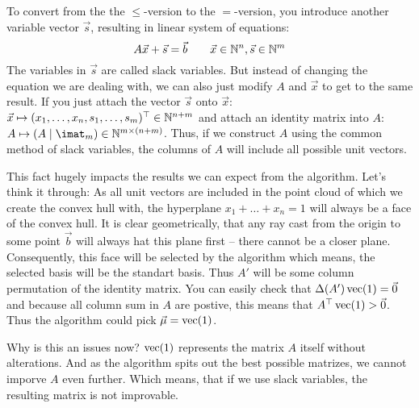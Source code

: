 To convert from the the $\leq$-version to the $=$-version, you introduce another variable vector $\vec s$, resulting in linear system of equations:
$$A\vec x + \vec s = \vec b \qquad \vec x \in \mathbb{N}^n, \vec s \in\mathbb{N}^m$$
The variables in $\vec s$ are called slack variables. But instead of changing the equation we are dealing with, we can also just modify $A$ and $\vec x$ to get to the same result. If you just attach the vector $\vec s$ onto $\vec x$: $\vec x \mapsto (x_1, \dots, x_n, s_1, \dots, s_m)^\top \in \mathbb{N}^{n+m}$ and attach an identity matrix into $A$: $A \mapsto (A \mid\imat_m) \in \N^{m \times (n + m)}$. Thus, if we construct $A$ using the common method of slack variables, the columns of $A$ will include all possible unit vectors.

This fact hugely impacts the results we can expect from the algorithm. Let's think it through: As all unit vectors are included in the point cloud of which we create the convex hull with, the hyperplane $x_1 + \dots + x_n = 1$ will always be a face of the convex hull. It is clear geometrically, that any ray cast from the origin to some point $\vec b$ will always hat this plane first – there cannot be a closer plane. Consequently, this face will be selected by the algorithm which means, the selected basis will be the standart basis.
Thus $A'$ will be some column permutation of the identity matrix. You can easily check that $\Delta(A')\operatorname{vec}(1) = \vec 0$ and because all column sum in $A$ are postive, this means that $A^\top \operatorname{vec}(1) > \vec 0$. Thus the algorithm could pick $\vec\mu = \operatorname{vec}(1)$.

Why is this an issues now? $\operatorname{vec}(1)$ represents the matrix $A$ itself without alterations. And as the algorithm spits out the best possible matrizes, we cannot imporve $A$ even further. Which means, that if we use slack variables, the resulting matrix is not improvable.